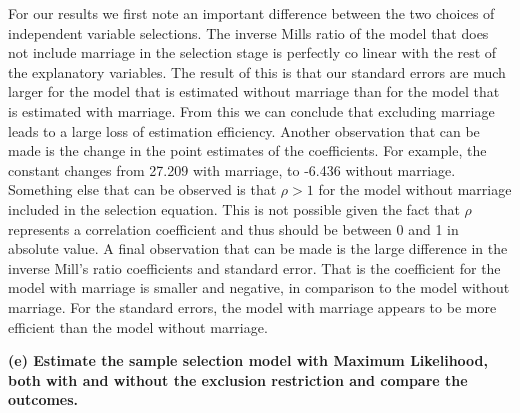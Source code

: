 \documentclass[
]{article}
\newenvironment{Shaded}{\begin{snugshade}}{\end{snugshade}}
\newcommand{\CommentTok}[1]{\textcolor[rgb]{0.56,0.35,0.01}{\textit{#1}}}
\newcommand{\DataTypeTok}[1]{\textcolor[rgb]{0.13,0.29,0.53}{#1}}
\newcommand{\DecValTok}[1]{\textcolor[rgb]{0.00,0.00,0.81}{#1}}
\newcommand{\KeywordTok}[1]{\textcolor[rgb]{0.13,0.29,0.53}{\textbf{#1}}}
\newcommand{\NormalTok}[1]{#1}
\newcommand{\OperatorTok}[1]{\textcolor[rgb]{0.81,0.36,0.00}{\textbf{#1}}}
\newcommand{\StringTok}[1]{\textcolor[rgb]{0.31,0.60,0.02}{#1}}
\begin{document}
For our results we first note an important difference between the two
choices of independent variable selections. The inverse Mills ratio of
the model that does not include marriage in the selection stage is
perfectly co linear with the rest of the explanatory variables. The
result of this is that our standard errors are much larger for the model
that is estimated without marriage than for the model that is estimated
with marriage. From this we can conclude that excluding marriage leads
to a large loss of estimation efficiency. Another observation that can
be made is the change in the point estimates of the coefficients. For
example, the constant changes from 27.209 with marriage, to -6.436
without marriage. Something else that can be observed is that \(\rho>1\)
for the model without marriage included in the selection equation. This
is not possible given the fact that \(\rho\) represents a correlation
coefficient and thus should be between 0 and 1 in absolute value. A
final observation that can be made is the large difference in the
inverse Mill's ratio coefficients and standard error. That is the
coefficient for the model with marriage is smaller and negative, in
comparison to the model without marriage. For the standard errors, the
model with marriage appears to be more efficient than the model without
marriage.

\textbf{(e) Estimate the sample selection model with Maximum Likelihood,
both with and without the exclusion restriction and compare the
outcomes.}

\begin{Shaded}
\end{Shaded}
\end{document}
